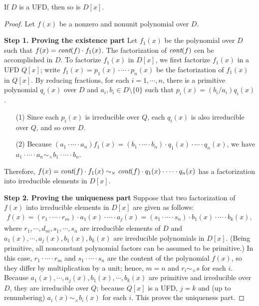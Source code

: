 \begin{thm}
    If $D$ is a UFD, then so is $D[x]$.
\end{thm}
\begin{proof}
    Let $f(x)$ be a nonzero and nonunit polynomial over $D$.

    \noindent\textbf{Step 1. Proving the existence part}\newline\indent
    Let $f_1(x)$ be the polynomial over $D$ such that $f(x)=\textit{cont}(f)\cdot f_1(x)$.
    The factorization of $\textit{cont}(f)$ cen be accomplished in $D$.
    To factorize $f_1(x)$ in $D[x]$, we first factorize $f_1(x)$ in a UFD $Q[x]$; write $f_1(x)=p_1(x)\cdot\cdots\cdot p_n(x)$ be the factorization of $f_1(x)$ in $Q[x]$.
    By reducing fractions, for each $i=1, \cdots, n$, there is a primitive polynomial $q_i(x)$ over $D$ and $a_i, b_i\in D\setminus\{0\}$ such that $p_i(x)=(b_i/a_i) q_i(x)$.
    \begin{enumerate}
        \item[(1)]
        {
            Since each $p_i(x)$ is irreducible over $Q$, each $q_i(x)$ is also irreducible over $Q$, and so over $D$.
        }
        \item[(2)]
        {
            Because $(a_1\cdot\cdots\cdot a_n)f_1(x)=(b_1\cdot\cdots\cdot b_n)\cdot q_1(x)\cdot\cdots\cdot q_n(x)$, we have $a_1\cdot\cdots\cdot a_n\sim_\times b_1\cdot\cdots\cdot b_n$.
        }
    \end{enumerate}
    Therefore, $f(x)=\textit{cont}(f)\cdot f_1(x)\sim_\times \textit{cont}(f)\cdot q_1(x)\cdot\cdots\cdot q_n(x)$ has a factorization into irreducible elements in $D[x]$.

    \noindent\textbf{Step 2. Proving the uniqueness part}\newline\indent
    Suppose that two factorization of $f(x)$ into irreducible elements in $D[x]$ are given as follows:
    \begin{align*}
        f(x)=(r_1\cdot\cdots\cdot r_m)\cdot a_1(x)\cdot\cdots\cdot a_j(x)=(s_1\cdot\cdots\cdot s_n)\cdot b_1(x)\cdot\cdots\cdot b_k(x),
    \end{align*}
    where $r_1, \cdots, d_m, s_1, \cdots, s_n$ are irreducible elements of $D$ and $a_1(x), \cdots, a_j(x), b_1(x), b_k(x)$ are irreducible polynomials in $D[x]$. (Being primitive, all nonconstant polynomial factors can be assumed to be primitive.)
    In this case, $r_1\cdot\cdots\cdot r_m$ and $s_1\cdot\cdots\cdot s_n$ are the content of the polynomial $f(x)$, so they differ by multiplication by a unit; hence, $m=n$ and $r_i\sim_\times s$ for each $i$.
    Because $a_1(x), \cdots, a_j(x), b_1(x), \cdots, b_k(x)$ are primitive and irreducible over $D$, they are irreducible over $Q$; because $Q[x]$ is a UFD, $j=k$ and (up to renumbering) $a_i(x)\sim_\times b_i(x)$ for each $i$.
    This proves the uniqueness part.
\end{proof}

